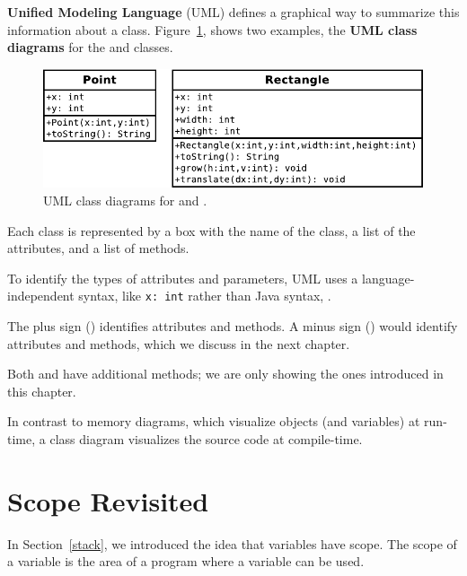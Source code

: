 {\bf Unified Modeling Language} (UML) defines a graphical way to summarize this information about a  class.
Figure~\ref{fig.umlPoint}, shows two examples, the {\bf UML class diagrams} for the  and  classes.

\begin{figure}[!ht]
\begin{center}
\includegraphics{figs/point-rect.pdf}
\caption{UML class diagrams for  and .}
\label{fig.umlPoint}
\end{center}
\end{figure}


Each class is represented by a box with the name of the class,
a list of the attributes, and a list of methods.


To identify the types of attributes and parameters, UML uses a language-independent syntax, like {\tt x:~int} rather than Java syntax, .

The plus sign (\java{+}) identifies  attributes and methods.
A minus sign (\java{-}) would identify  attributes and methods, which we discuss in the next chapter.

Both  and  have additional methods; we are only showing the ones introduced in this chapter.

In contrast to memory diagrams, which visualize objects (and variables) at run-time, a class diagram visualizes the source code at compile-time.


\section{Scope Revisited}


In Section~\ref{stack}, we introduced the idea that variables have scope.
The scope of a variable is the area of a program where a variable can be used.


